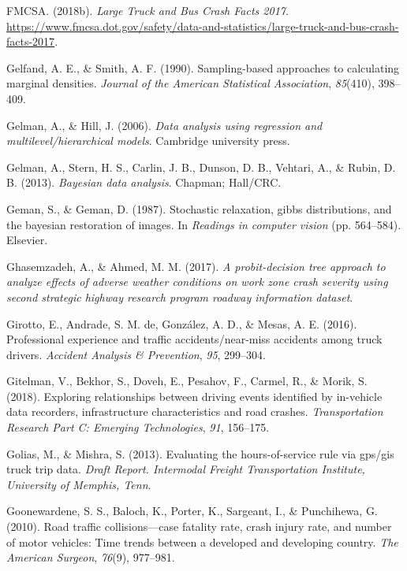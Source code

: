 \documentclass[12pt]{book}
\numberwithin{equation}{chapter}
\begin{document}
\leavevmode\hypertarget{ref-fmcsareport2017}{}%
FMCSA. (2018b). \emph{Large Truck and Bus Crash Facts 2017}. \url{https://www.fmcsa.dot.gov/safety/data-and-statistics/large-truck-and-bus-crash-facts-2017}.

\leavevmode\hypertarget{ref-gelfand1990sampling}{}%
Gelfand, A. E., \& Smith, A. F. (1990). Sampling-based approaches to calculating marginal densities. \emph{Journal of the American Statistical Association}, \emph{85}(410), 398--409.

\leavevmode\hypertarget{ref-gelman2006data}{}%
Gelman, A., \& Hill, J. (2006). \emph{Data analysis using regression and multilevel/hierarchical models}. Cambridge university press.

\leavevmode\hypertarget{ref-gelman2013bayesian}{}%
Gelman, A., Stern, H. S., Carlin, J. B., Dunson, D. B., Vehtari, A., \& Rubin, D. B. (2013). \emph{Bayesian data analysis}. Chapman; Hall/CRC.

\leavevmode\hypertarget{ref-geman1987stochastic}{}%
Geman, S., \& Geman, D. (1987). Stochastic relaxation, gibbs distributions, and the bayesian restoration of images. In \emph{Readings in computer vision} (pp. 564--584). Elsevier.

\leavevmode\hypertarget{ref-ghasemzadeh2017probit}{}%
Ghasemzadeh, A., \& Ahmed, M. M. (2017). \emph{A probit-decision tree approach to analyze effects of adverse weather conditions on work zone crash severity using second strategic highway research program roadway information dataset}.

\leavevmode\hypertarget{ref-girotto2016professional}{}%
Girotto, E., Andrade, S. M. de, González, A. D., \& Mesas, A. E. (2016). Professional experience and traffic accidents/near-miss accidents among truck drivers. \emph{Accident Analysis \& Prevention}, \emph{95}, 299--304.

\leavevmode\hypertarget{ref-gitelman2018exploring}{}%
Gitelman, V., Bekhor, S., Doveh, E., Pesahov, F., Carmel, R., \& Morik, S. (2018). Exploring relationships between driving events identified by in-vehicle data recorders, infrastructure characteristics and road crashes. \emph{Transportation Research Part C: Emerging Technologies}, \emph{91}, 156--175.

\leavevmode\hypertarget{ref-golias2013evaluating}{}%
Golias, M., \& Mishra, S. (2013). Evaluating the hours-of-service rule via gps/gis truck trip data. \emph{Draft Report. Intermodal Freight Transportation Institute, University of Memphis, Tenn}.

\leavevmode\hypertarget{ref-goonewardene2010road}{}%
Goonewardene, S. S., Baloch, K., Porter, K., Sargeant, I., \& Punchihewa, G. (2010). Road traffic collisions---case fatality rate, crash injury rate, and number of motor vehicles: Time trends between a developed and developing country. \emph{The American Surgeon}, \emph{76}(9), 977--981.
\end{document}
